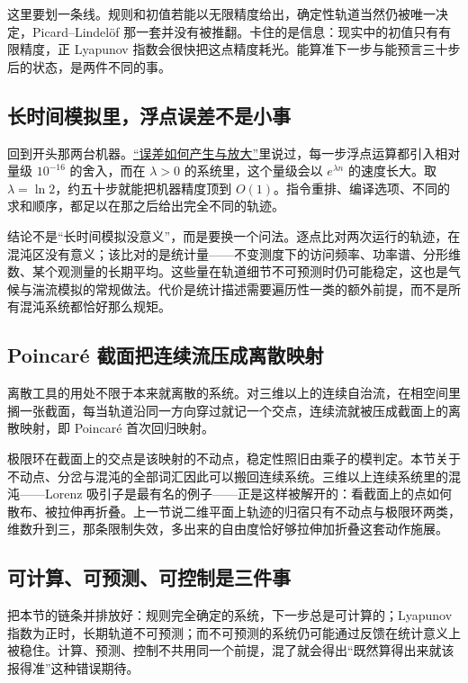 这里要划一条线。规则和初值若能以无限精度给出，确定性轨道当然仍被唯一决定，Picard--Lindelöf 那一套并没有被推翻。卡住的是信息：现实中的初值只有有限精度，正 Lyapunov 指数会很快把这点精度耗光。能算准下一步与能预言三十步后的状态，是两件不同的事。

\subsection{长时间模拟里，浮点误差不是小事}

回到开头那两台机器。\hyperref[sec:08-Numerical-Analysis/01-Floating-Point-and-Error/02]{``误差如何产生与放大''}里说过，每一步浮点运算都引入相对量级 \(10^{-16}\) 的舍入，而在 \(\lambda>0\) 的系统里，这个量级会以 \(e^{\lambda n}\) 的速度长大。取 \(\lambda=\ln2\)，约五十步就能把机器精度顶到 \(O(1)\)。指令重排、编译选项、不同的求和顺序，都足以在那之后给出完全不同的轨迹。

结论不是``长时间模拟没意义''，而是要换一个问法。逐点比对两次运行的轨迹，在混沌区没有意义；该比对的是统计量——不变测度下的访问频率、功率谱、分形维数、某个观测量的长期平均。这些量在轨道细节不可预测时仍可能稳定，这也是气候与湍流模拟的常规做法。代价是统计描述需要遍历性一类的额外前提，而不是所有混沌系统都恰好那么规矩。

\subsection{Poincaré 截面把连续流压成离散映射}

离散工具的用处不限于本来就离散的系统。对三维以上的连续自治流，在相空间里搁一张截面，每当轨道沿同一方向穿过就记一个交点，连续流就被压成截面上的离散映射，即 Poincaré 首次回归映射。

极限环在截面上的交点是该映射的不动点，稳定性照旧由乘子的模判定。本节关于不动点、分岔与混沌的全部词汇因此可以搬回连续系统。三维以上连续系统里的混沌——Lorenz 吸引子是最有名的例子——正是这样被解开的：看截面上的点如何散布、被拉伸再折叠。上一节说二维平面上轨迹的归宿只有不动点与极限环两类，维数升到三，那条限制失效，多出来的自由度恰好够拉伸加折叠这套动作施展。

\subsection{可计算、可预测、可控制是三件事}

把本节的链条并排放好：规则完全确定的系统，下一步总是可计算的；Lyapunov 指数为正时，长期轨道不可预测；而不可预测的系统仍可能通过反馈在统计意义上被稳住。计算、预测、控制不共用同一个前提，混了就会得出``既然算得出来就该报得准''这种错误期待。

